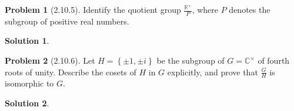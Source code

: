 \documentclass[12pt]{article}
\theoremstyle{definition} %
\newtheorem{solution}{Solution}
\newtheorem{problem}{Problem}
\theoremstyle{plain} %
\begin{document}
\begin{problem}[2.10.5]
   Identify the quotient group $\frac{\mathbb{{R}}^{\times}}{P}$, where $P$ denotes the subgroup of positive real numbers.  
\end{problem}
\begin{solution}
    
\end{solution}
\begin{problem}[2.10.6]
  Let $H=\left\{ \pm 1, \pm i \right\} $  be the subgroup of $G=\mathbb{{C}}^{\times}$ of fourth roots of unity. Describe the cosets of $H$ in $G$ explicitly, and prove that $\frac{G}{H}$   is isomorphic to $G$. 
\end{problem}
\begin{solution}
    
\end{solution}
\end{document}
